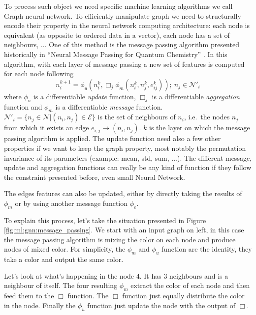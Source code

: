 \documentclass[../main.tex]{subfiles}
\begin{document}
To process such object we need specific machine learning algorithms we call Graph neural network.
To efficiently manipulate graph we need to structurally encode their property in the neural network computing architecture: each node is equivalent (as opposite to ordered data in a vector), each node has a set of neighbours, $\ldots$ One of this method is the message passing algorithm presented historically in ``Neural Message Passing for Quantum Chemistry'' \cite{gilmer_neural_2017}. In this algorithm, with each layer of message passing a new set of features is computed for each node following
\begin{equation}
  n_i^{k+1} = \phi_u (n_i^k, \Box_j \phi_m(n_i^k, n_j^k, e^k_{ij})); ~ n_j \in \mathcal{N}'_i
\end{equation}
where $\phi_u$ is a differentiable \textit{update} function, $\Box_j$ is a differentiable \textit{aggregation} function and $\phi_m$ is a differentiable \textit{message} function. $\mathcal{N}'_i = \{n_j \in \mathcal{N} | (n_i, n_j) \in \mathcal{E}\}$ is the set of neighbours of $n_i$, i.e.\ the nodes $n_j$ from which it exists an edge $e_{i,j} \rightarrow (n_i, n_j)$. $k$ is the layer on which the message passing algorithm is applied. The update function need also a few other properties if we want to keep the graph property, most notably the permutation invariance of its parameters (example: mean, std, sum, ...). The different message, update and aggregation functions can really be any kind of function if they follow the constraint presented before, even small Neural Network.

The edges features can also be updated, either by directly taking the results of $\phi_m$ or by using another message function $\phi_e$.

To explain this process, let's take the situation presented in Figure \ref{fig:ml:gnn:message_passing}. We start with an input graph on left, in this case the message passing algorithm is mixing the color on each node and produce nodes of mixed color. For simplicity, the $\phi_m$ and $\phi_u$ function are the identity, they take a color and output the same color.

Let's look at what's happening in the node 4. It has 3 neighbours and is a neighbour of itself. The four resulting $\phi_m$ extract the color of each node and then feed them to the $\Box$ function. The $\Box$ function just equally distribute the color in the node. Finally the $\phi_u$ function just update the node with the output of $\Box$.
\end{document}
